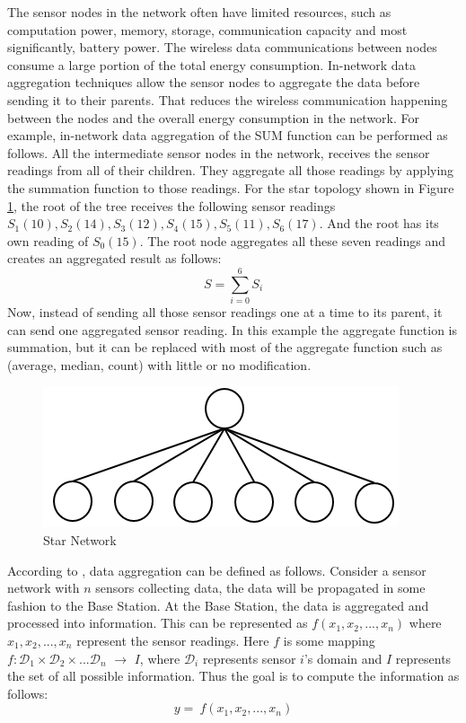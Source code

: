 	The sensor nodes in the network often have limited resources, such as computation power, memory, storage, communication capacity and most significantly, battery power.
	The wireless data communications between nodes consume a large portion of the total energy consumption. 
	In-network data aggregation techniques allow the sensor nodes to aggregate the data before sending it to their parents.
	That reduces the wireless communication happening between the nodes and the overall energy consumption in the network. 	
	For example, in-network data aggregation of the SUM function can be performed as follows.
	All the intermediate sensor nodes in the network, receives the sensor readings from all of their children.
	They aggregate all those readings by applying the summation function to those readings.
	For the star topology shown in Figure \ref{fig:star-network}, the root of the tree receives the following sensor readings $S_{1}(10),S_{2}(14),S_{3}(12),S_{4}(15),S_{5}(11),S_{6}(17)$. And the root has its own reading of $S_{0}(15)$. 
	The root node aggregates all these seven readings and creates an aggregated result as follows:
	\begin{equation}
		S = \sum_{i=0}^6 S_{i}
	\end{equation}
	Now, instead of sending all those sensor readings one at a time to its parent, it can send one aggregated sensor reading.
	In this example the aggregate function is summation, but it can be replaced with most of the aggregate function such as (average, median, count) with little or no modification.
	\begin{figure}[h!]
		\centering
		\includegraphics[scale = 1]{images/star-tree.png}
		\caption{Star Network}
		\label{fig:star-network}
	\end{figure}

	According to \cite{zareafifi2012secure}, data aggregation can be defined as follows.
	Consider a sensor network with $n$ sensors collecting data, the data will be propagated in some fashion to the Base Station.
	At the Base Station, the data is aggregated and processed into information. 
	This can be represented as
		$f(x_{1}, x_{2},...,x_{n})$
	where $x_{1}, x_{2},..., x_{n}$ represent the sensor readings.
	Here $f$ is some mapping $f: \mathcal{D}_{1} \times \mathcal{D}_{2} \times ... \mathcal{D}_{n}$ $\rightarrow$ $I$, where $\mathcal{D}_{i}$ represents sensor $i$'s domain and $I$ represents the set of all possible information. 
	Thus the goal is to compute the information as follows:
	\begin{equation}
		\label{eq:aggregation}
		y =\ f(x_{1}, x_{2},...,x_{n})
	\end{equation}

